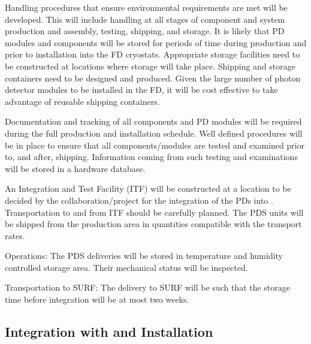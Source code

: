 Handling procedures that ensure environmental requirements are met will be developed. This will include handling at all stages of component and system production and assembly, testing, shipping, and storage. It is likely that PD modules and components will be stored for periods of time during production and prior to installation into the FD cryostats. Appropriate storage facilities need to be constructed at locations where storage will take place. Shipping and storage containers need to be designed and produced. Given the large number of photon detector modules to be installed in the FD, it will be cost effective to take advantage of reusable shipping containers.

Documentation and tracking of all components and PD modules will be required during the full production and installation schedule. Well defined procedures will be in place to ensure that all components/modules are tested and examined prior to, and after, shipping. Information coming from such testing and examinations will be stored in a hardware database.

An Integration and Test Facility (ITF) will be constructed at a location to be decided by the collaboration/project for the integration of the PDs into . Transportation to and from ITF should be carefully planned. The PDS units will be shipped from the production area in quantities compatible with the  transport rates.
    
Operations: The PDS deliveries will be stored in temperature and humidity controlled storage area. Their mechanical status will be inspected.

Transportation to SURF: The delivery to SURF will be such that the storage time before integration will be at most two weeks.


\subsection{Integration with  and Installation}
\label{sec:fdsp-pd-install-pd-apa}



